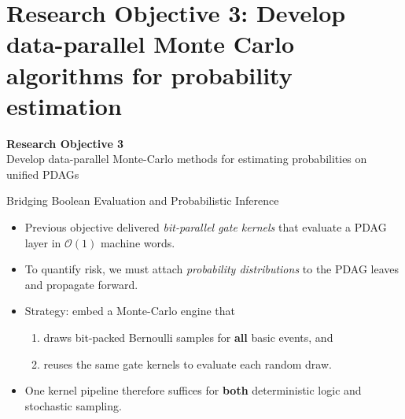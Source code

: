 \section{Research Objective 3: Develop data-parallel Monte Carlo algorithms for probability estimation}

\begin{frame}
  \Large\centering\textbf{Research Objective 3}\\[6pt]
  \large Develop data-parallel Monte-Carlo methods for estimating probabilities on unified PDAGs
\end{frame}

\begin{frame}{Bridging Boolean Evaluation and Probabilistic Inference}
  \begin{itemize}
    \item Previous objective delivered \emph{bit-parallel gate kernels} that evaluate a PDAG layer in $\mathcal{O}(1)$ machine words.
    \item To quantify \alert{risk}, we must attach \emph{probability distributions} to the PDAG leaves and propagate forward.
    \item Strategy: embed a Monte-Carlo engine that
          \begin{enumerate}
            \item draws bit-packed Bernoulli samples for \textbf{all} basic events, and
            \item reuses the same gate kernels to evaluate each random draw.
          \end{enumerate}
    \item One kernel pipeline therefore suffices for \textbf{both} deterministic logic and stochastic sampling.
  \end{itemize}
\end{frame}

